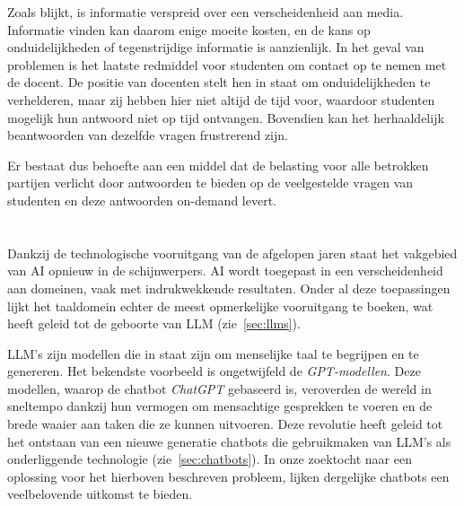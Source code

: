 Zoals blijkt, is informatie verspreid over een verscheidenheid aan media. Informatie vinden kan daarom enige moeite kosten, en de kans op onduidelijkheden of tegenstrijdige informatie is aanzienlijk. In het geval van problemen is het laatste redmiddel voor studenten om contact op te nemen met de docent. De positie van docenten stelt hen in staat om onduidelijkheden te verhelderen, maar zij hebben hier niet altijd de tijd voor, waardoor studenten mogelijk hun antwoord niet op tijd ontvangen. Bovendien kan het herhaaldelijk beantwoorden van dezelfde vragen frustrerend zijn.

Er bestaat dus behoefte aan een middel dat de belasting voor alle betrokken partijen verlicht door antwoorden te bieden op de veelgestelde vragen van studenten en deze antwoorden on-demand levert. 

\section{}%
\label{sec:onderzoeksvraag}


Dankzij de technologische vooruitgang van de afgelopen jaren staat het vakgebied van \acrfull{AI} opnieuw in de schijnwerpers. \acrlong{AI} wordt toegepast in een verscheidenheid aan domeinen, vaak met indrukwekkende resultaten. Onder al deze toepassingen lijkt het taaldomein echter de meest opmerkelijke vooruitgang te boeken, wat heeft geleid tot de geboorte van \acrfull{LLM} (zie~\ref{sec:llms}).
 
\acrshort{LLM}'s zijn modellen die in staat zijn om menselijke taal te begrijpen en te genereren. Het bekendste voorbeeld is ongetwijfeld de \emph{\gls{GPT-modellen}}. Deze modellen, waarop de chatbot \emph{ChatGPT} gebaseerd is, veroverden de wereld in sneltempo dankzij hun vermogen om mensachtige gesprekken te voeren en de brede waaier aan taken die ze kunnen uitvoeren. Deze revolutie heeft geleid tot het ontstaan van een nieuwe generatie chatbots die gebruikmaken van \acrshort{LLM}'s als onderliggende technologie (zie~\ref{sec:chatbots}). In onze zoektocht naar een oplossing voor het hierboven beschreven probleem, lijken dergelijke chatbots een veelbelovende uitkomst te bieden.

